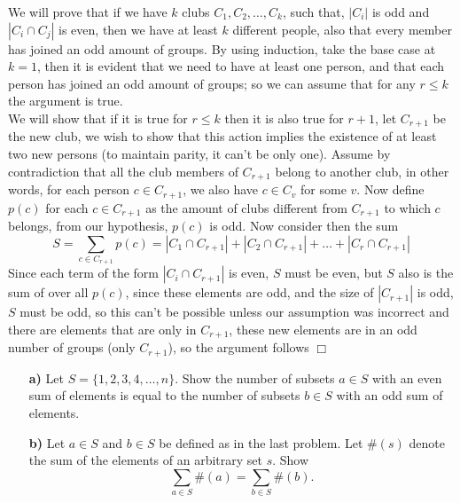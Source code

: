 \begin{solution}
    We will prove that if we have $k$ clubs $C_1, C_2, \ldots, C_k$, such that, $|C_i|$ is odd and $|C_i \cap C_j|$ is even, then we have at least $k$ different people, also that every member has joined an odd amount of groups. By using induction, take the base case at $k=1$, then it is evident that we need to have at least one person, and that each person has joined an odd amount of groups; so we can assume that for any $r \leq k$ the argument is true. \\
    We will show that if it is true for $r \leq k$ then it is also true for $r+1$, let $C_{r+1}$ be the new club, we wish to show that this action implies the existence of at least two new persons (to maintain parity, it can't be only one). Assume by contradiction that all the club members of $C_{r+1}$ belong to another club, in other words, for each person $c \in C_{r+1}$, we also have $c \in C_v$ for some $v$. Now define $p(c)$ for each $c \in C_{r+1}$ as the amount of clubs different from $C_{r+1}$ to which $c$ belongs, from our hypothesis, $p(c)$ is odd. Now consider then the sum
    $$S = \sum_{c \in C_{r+1}} p(c) =|C_1 \cap C_{r+1}| + |C_2 \cap C_{r+1}| + \ldots + |C_r \cap C_{r+1}|$$
    Since each term of the form $|C_i \cap C_{r+1}|$ is even, $S$ must be even, but $S$ also is the sum of over all $p(c)$, since these elements are odd, and the size of $|C_{r+1}|$ is odd, $S$ must be odd, so this can't be possible unless our assumption was incorrect and there are elements that are only in $C_{r+1}$, these new elements are in an odd number of groups (only $C_{r+1}$), so the argument follows $\Box$
\end{solution}

\begin{problem}[C][9][Folklore]
\begin{enumerate} 
\item[\textbf{a)}] Let $S = \{1, 2, 3, 4, \dots, n\}$. Show the number of subsets $a \in S$ with an even sum of elements is equal to the number of subsets $b \in S$
with an odd sum of elements. 
\item[\textbf{b)}] Let $a \in S$ and $b \in S$ be defined as in the last problem. Let $\#(s)$ denote the sum of the elements of an arbitrary set $s$. Show \[\sum_{a \in S} \#(a) = \sum_{b \in S} \#(b).\]
\end{enumerate}
\end{problem}

